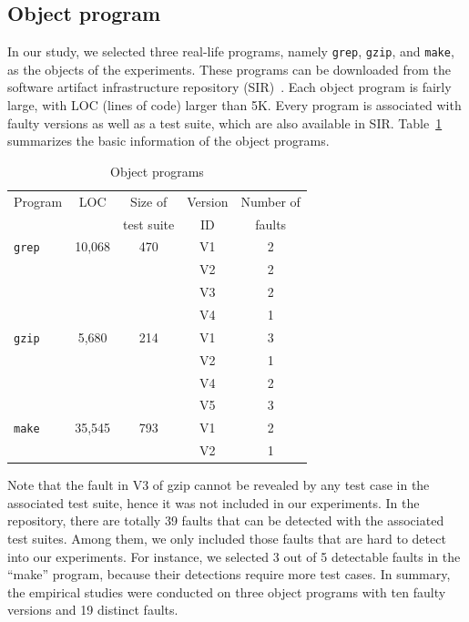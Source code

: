 \documentclass[10pt,journal,compsoc]{IEEEtran}
\begin{document}
\subsection{Object program}

In our study, we selected three real-life programs, namely \texttt{grep}, \texttt{gzip}, and \texttt{make}, as the objects of the experiments. These programs can be downloaded from the software artifact infrastructure repository (SIR)~\cite{Do05}. Each object program is fairly large, with LOC (lines of code) larger than 5K. Every program is associated with faulty versions as well as a test suite, which are also available in SIR. Table~\ref{tab:objects} summarizes the basic information of the object programs.

\begin{table}
\caption{Object programs}
\label{tab:objects}
\centering
\begin{tabular}{|l|c|c|c|c|} \hline
Program				& LOC			& Size of			& Version	& Number of	\\
        			&					& test suite	& ID			& faults		\\ \hline
\texttt{grep}	    & 10,068	        & 470					& V1			& 2					\\ \cline{4-5}
        			&					& 						& V2			& 2					\\ \cline{4-5}
        			&					& 						& V3			& 2					\\ \cline{4-5}
        			&					& 						& V4			& 1					\\ \hline
\texttt{gzip}	    & 5,680		        & 214					& V1			& 3					\\ \cline{4-5}
        			&					& 						& V2			& 1					\\ \cline{4-5}
        			&					& 						& V4			& 2					\\ \cline{4-5}
        			&					& 						& V5			& 3					\\ \hline
\texttt{make}	    & 35,545	        & 793					& V1			& 2					\\ \cline{4-5}
        			&					& 						& V2			& 1					\\ \hline
\end{tabular}
\end{table}

Note that the fault in V3 of gzip cannot be revealed by any test case in the associated test suite, hence it was not included in our experiments. In the repository, there are totally 39 faults that can be detected with the associated test suites. Among them, we only included those faults that are hard to detect into our experiments. For instance, we selected 3 out of 5 detectable faults in the ``make'' program, because their detections require more test cases. In summary, the empirical studies were conducted on three object programs with ten faulty versions and 19 distinct faults.
\end{document}
